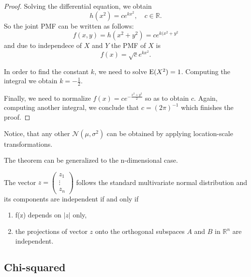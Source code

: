 \begin{proof}
Solving the differential equation, we obtain
\[
h(x^2) = c e^{kx^2}, \quad c \in \mathbb{R}.
\]
So the joint PMF can be written as follows:
\[
f(x,y) = h(x^2 + y^2) = c e^{k(x^2+y^2}
\]
and due to independece of $X$ and $Y$ the PMF of $X$ is
\[
f(x) = \sqrt{c} e^{kx^2}.
\]


In order to find the constant $k$, we need to solve $\operatorname{E}(X^2) = 1$.
Computing the integral we obtain $k=-\frac{1}{2}$.

Finally, we need to normalize $f(x) = c e^{-\frac{x^2 + y^2}{2}}$ so as to
obtain $c$. Again, computing another integral,
we conclude that $c=(2\pi)^{-1}$ which finishes the proof.
\end{proof}

Notice, that any other $\mathcal{N}(\mu, \sigma^2)$ can be obtained by applying
location-scale transformations.

The theorem can be generalized to the n-dimensional case.
\begin{theorem}\label{th:mvn}
The vector $z = \begin{pmatrix} z_1 \\ \vdots \\ z_n \end{pmatrix}$
follows the standard multivariate normal distribution and its components
are independent if and only if
\begin{enumerate}
  \item f(z) depends on $\vert z \vert$ only,
  \item the projections of vector $z$ onto the orthogonal subspaces $A$ and $B$
  in $\mathbb{R}^n$ are independent.
\end{enumerate}
\end{theorem}


\subsection{Chi-squared}

